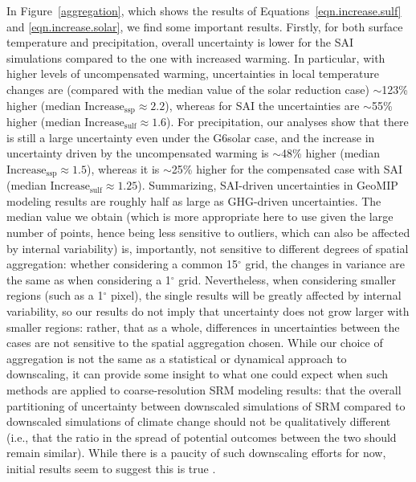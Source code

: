 \documentclass[draft]{agujournal2019}
\begin{document}
In Figure~\ref{aggregation}, which shows the results of Equations~\ref{eqn.increase.sulf} and \ref{eqn.increase.solar}, we find some important results. Firstly, for both surface temperature and precipitation, overall uncertainty is lower for the SAI simulations compared to the one with increased warming. In particular, with higher levels of uncompensated warming, uncertainties in local temperature changes are (compared with the median value of the solar reduction case) $\sim$123\% higher (median $\mbox{Increase}_{\mathrm{ssp}} \approx 2.2$), whereas for SAI the uncertainties are $\sim$55\% higher (median $\mbox{Increase}_{\mathrm{sulf}} \approx 1.6$). For precipitation, our analyses show that there is still a large uncertainty even under the G6solar case, and the increase in uncertainty driven by the uncompensated warming is $\sim$48\% higher (median $\mbox{Increase}_{\mathrm{ssp}} \approx 1.5$), whereas it is $\sim$25\% higher for the compensated case with SAI (median $\mbox{Increase}_{\mathrm{sulf}} \approx 1.25$). Summarizing, SAI-driven uncertainties in GeoMIP modeling results are roughly half as large as GHG-driven uncertainties. The median value we obtain (which is more appropriate here to use given the large number of points, hence being less sensitive to outliers, which can also be affected by internal variability) is, importantly, not sensitive to different degrees of spatial aggregation: whether considering a common 15$^{\circ}$ grid, the changes in variance are the same as when considering a 1$^{\circ}$ grid. Nevertheless, when considering smaller regions (such as a 1$^{\circ}$ pixel), the single results will be greatly affected by internal variability, so our results do not imply that uncertainty does not grow larger with smaller regions: rather, that as a whole, differences in uncertainties between the cases are not sensitive to the spatial aggregation chosen. While our choice of aggregation is not the same as a statistical or dynamical approach to downscaling, it can provide some insight to what one could expect when such methods are applied to coarse-resolution SRM modeling results: that the overall partitioning of uncertainty between downscaled simulations of SRM compared to downscaled simulations of climate change should not be qualitatively different (i.e., that the ratio in the spread of potential outcomes between the two should remain similar). While there is a paucity of such downscaling efforts for now, initial results seem to suggest this is true \cite{Sun2026}.
\end{document}

